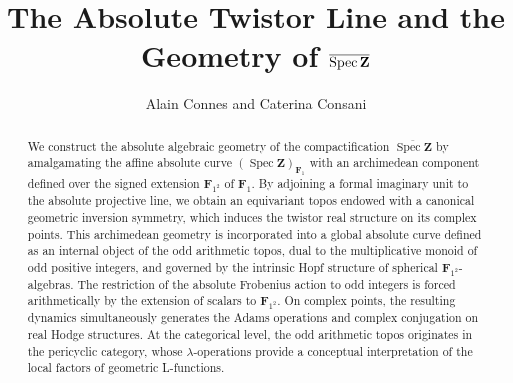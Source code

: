 \documentclass[11pt,a4paper]{article}
\title{\Large
The Absolute Twistor Line and the Geometry of
$\overline{\Spec\Z}$}
\author{Alain Connes and Caterina Consani}
\date{}
\newcommand{\Z}{\mathbf{Z}}
\newcommand{\Fone}{\mathbf{F}_{1}}
\newcommand{\Ftwo}{\mathbf{F}_{1^2}}
\def\spzf{(\Spec \Z)_{\mathbf{F}_{1}}}
\newcommand{\Spec}{\operatorname{Spec}}
\begin{document}
\maketitle



\begin{abstract}

We construct the absolute algebraic geometry of the compactification \(\overline{\Spec \Z}\) by amalgamating the affine absolute curve \(\spzf\) with an archimedean component defined over the signed extension \(\Ftwo\) of \(\Fone\). By adjoining a formal imaginary unit to the absolute projective line, we obtain an equivariant topos endowed with a canonical geometric inversion symmetry, which induces the twistor real structure on its complex points.
This archimedean geometry is  incorporated into a global absolute curve defined as an internal object of the odd arithmetic topos, dual to the multiplicative monoid of odd positive integers, and governed by the intrinsic Hopf structure of spherical \(\Ftwo\)-algebras.
The restriction of the absolute Frobenius action to odd integers is forced arithmetically by the extension of scalars to \(\Ftwo\). On complex points, the resulting dynamics simultaneously generates the Adams operations and complex conjugation on real Hodge structures.
At the categorical level, the odd arithmetic topos originates in the pericyclic category, whose $\lambda$-operations provide a conceptual interpretation of the local factors of geometric L-functions.

\end{abstract}
\end{document}
